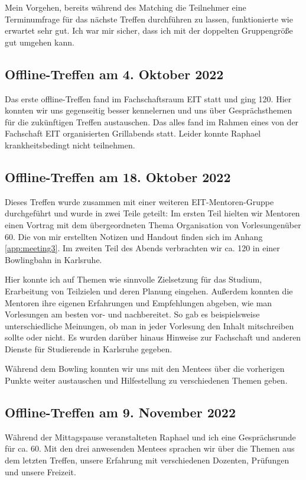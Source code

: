 \documentclass[
    paper=A4,
    div=calc,
    numbers=noendperiod
]{scrartcl}
\begin{document}
        Mein Vorgehen, bereits während des Matching die Teilnehmer eine Terminumfrage für das nächste Treffen durchführen zu lassen, funktionierte wie erwartet sehr gut. Ich war mir sicher, dass ich mit der doppelten Gruppengröße gut umgehen kann.

    \subsection{Offline-Treffen am 4. Oktober 2022}
        Das erste offline-Treffen fand im Fachschaftsraum EIT statt und ging \SI{120}{\min}. Hier konnten wir uns gegenseitig besser kennelernen und uns über Gesprächsthemen für die zukünftigen Treffen austauschen. Das alles fand im Rahmen eines von der Fachschaft EIT organisierten Grillabends statt. Leider konnte Raphael krankheitsbedingt nicht teilnehmen.

    \subsection{Offline-Treffen am 18. Oktober 2022}
        Dieses Treffen wurde zusammen mit einer weiteren EIT-Mentoren-Gruppe durchgeführt und wurde in zwei Teile geteilt: Im ersten Teil hielten wir Mentoren einen Vortrag mit dem übergeordneten Thema \glqq Organisation von Vorlesungen\grqq über \SI{60}{\min}. Die von mir erstellten Notizen und Handout finden sich im Anhang \ref{app:meeting3}. Im zweiten Teil des Abends verbrachten wir ca. \SI{120}{\min} in einer Bowlingbahn in Karlsruhe.

        Hier konnte ich auf Themen wie sinnvolle Zielsetzung für das Studium, Erarbeitung von Teilzielen und deren Planung eingehen. Außerdem konnten die Mentoren ihre eigenen Erfahrungen und Empfehlungen abgeben, wie man Vorlesungen am besten vor- und nachbereitet. So gab es beispielsweise unterschiedliche Meinungen, ob man in jeder Vorlesung den Inhalt mitschreiben sollte oder nicht. Es wurden darüber hinaus Hinweise zur Fachschaft und anderen Dienste für Studierende in Karlsruhe gegeben.

        Während dem Bowling konnten wir uns mit den Mentees über die vorherigen Punkte weiter austauschen und Hilfestellung zu verschiedenen Themen geben. 

    \subsection{Offline-Treffen am 9. November 2022}
        Während der Mittagspause veranstalteten Raphael und ich eine Gesprächsrunde für ca. \SI{60}{\min}. Mit den drei anwesenden Mentees sprachen wir über die Themen aus dem letzten Treffen, unsere Erfahrung mit verschiedenen Dozenten, Prüfungen und unsere Freizeit.
        
\end{document}
